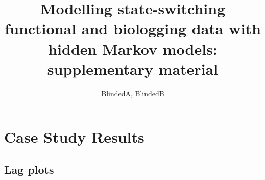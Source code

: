\documentclass{article}
\begin{document}



\title{Modelling state-switching functional and biologging data with hidden Markov models: supplementary material}%
\date{}
\author{BlindedA, BlindedB}%


\maketitle

\addtocounter{tablenum}{1}
\addtocounter{fignum}{1}

\section{Case Study Results}

    \subsection{Lag plots}
        
\end{document}
